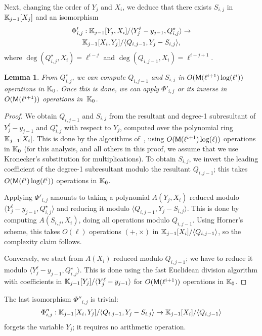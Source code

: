 \documentclass{sig-alternate}
\newtheorem{lemma}[definition]{Lemma}
\begin{document}
Next, changing the order of $Y_j$ and $X_i$, we deduce that there
exists $S_{i,j}$ in $\mathbb{K}_{j-1}[X_j]$ and an isomorphism
\begin{multline*}
\Phi'_{i,j}: \mathbb{K}_{j-1}[Y_j,X_i]/\langle Y_j^\ell-y_{j-1}, Q^\star_{i,j}\rangle
\to\\ \mathbb{K}_{j-1}[X_i, Y_j]/\langle Q_{i,j-1}, Y_j-S_{i,j}\rangle,
\end{multline*}
where $\deg(Q^\star_{i,j},X_i)=\ell^{i-j}$ and
$\deg(Q_{i,j-1},X_i)=\ell^{i-j+1}$. 
\begin{lemma}
  From $Q^\star_{i,j}$, we can compute $Q_{i,j-1}$ and $S_{i,j}$ in
  $O(\mathsf{M}(\ell^{i+1})\log(\ell^i))$ operations in $\mathbb{K}_0$.  Once this
  is done, we can apply $\Phi'_{i,j}$ or its inverse in
  $O(\mathsf{M}(\ell^{i+1}))$ operations in~$\mathbb{K}_0$.
\end{lemma}
\begin{proof}
  We obtain $Q_{i,j-1}$ and $S_{i,j}$ from the resultant and degree-1
  subresultant of $Y_j^\ell-y_{j-1}$ and $Q^\star_{i,j}$ with respect
  to $Y_j$, computed over the polynomial ring $\mathbb{K}_{j-1}[X_i]$. This is
  done by the algorithms of~\cite{Reischert97,LiRo01}, using
  $O(\mathsf{M}(\ell^{i+1})\log(\ell))$ operations in $\mathbb{K}_0$ (for this
  analysis, and all others in this proof, we assume that we use Kronecker's
  substitution for multiplications). To obtain $S_{i,j}$, we
  invert the leading coefficient of the degree-1 subresultant modulo
  the resultant $Q_{i,j-1}$; this takes
  $O(\mathsf{M}(\ell^{i})\log(\ell^i))$ operations in $\mathbb{K}_0$.

  Applying $\Phi'_{i,j}$ amounts to taking a polynomial $A(Y_j,X_i)$ 
  reduced modulo $\langle Y_j^\ell-y_{j-1}, Q^\star_{i,j}\rangle$
  and reducing it modulo $\langle Q_{i,j-1}, Y_j-S_{i,j}\rangle$. This
  is done by computing $A(S_{i,j},X_i)$, doing all operations
  modulo $Q_{i,j-1}$. Using Horner's scheme, this takes $O(\ell)$ 
  operations $(+,\times)$ in $\mathbb{K}_{j-1}[X_i]/\langle Q_{i,j-1}\rangle$,
  so the complexity claim follows.

  Conversely, we start from $A(X_i)$ reduced modulo $Q_{i,j-1}$; we
  have to reduce it modulo $\langle Y_j^\ell-y_{j-1},
  Q^\star_{i,j}\rangle$. This is done using the fast Euclidean
  division algorithm with coefficients in $\mathbb{K}_{j-1}[Y_j]/\langle
  Y_j^\ell-y_{j-1}\rangle$ for $O(\mathsf{M}(\ell^{i+1}))$
  operations in $\mathbb{K}_0$.
\end{proof}

The last isomorphism $\Phi''_{i,j}$ is trivial:
$$\Phi''_{i,j}: \mathbb{K}_{j-1}[X_i, Y_j]/\langle Q_{i,j-1}, Y_j-S_{i,j}\rangle
\to \mathbb{K}_{j-1}[X_i]/\langle Q_{i,j-1}\rangle$$
forgets the variable $Y_j$; it requires no arithmetic operation.
\end{document}
